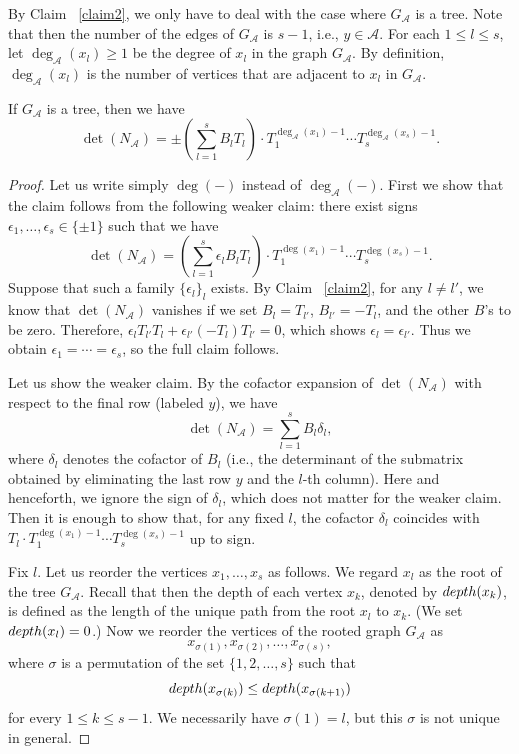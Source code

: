 \documentclass[11pt]{article}
\theoremstyle{definition}
\numberwithin{equation}{section}
\newcommand{\cA}{\mathcal{A}}
\newcommand{\depth}{{\rm depth}}
\begin{document}
By Claim ~\ref{claim2}, we only have to deal with the case where $G_{\cA}$ is a tree.
Note that then the number of the edges of $G_{\cA}$ is $s-1$, i.e., $y \in \cA$.
For each $1 \leq l \leq s$, let $\deg_{\cA}(x_l) \geq 1$ be the degree of $x_l$ in the graph $G_{\cA}$.
By definition, $\deg_{\cA}(x_l)$ is the number of vertices that are adjacent to $x_l$ in $G_{\cA}$.

\begin{claim}\label{claim3}
If $G_{\cA}$ is a tree, then we have
\[
\det(N_{\cA}) = \pm \left(\sum_{l = 1}^s B_l T_l \right) \cdot T_1^{\deg_{\cA}(x_1)-1} \cdots T_s^{\deg_{\cA}(x_s) - 1}.
\]
\end{claim}

\begin{proof}
Let us write simply $\deg(-)$ instead of $\deg_{\cA}(-)$.
First we show that the claim follows from the following weaker claim: there exist signs $\epsilon_1, \dots, \epsilon_s \in \{\pm 1\}$ such that we have
\[
\det(N_{\cA}) = \left(\sum_{l = 1}^s \epsilon_l B_l T_l \right) \cdot T_1^{\deg(x_1)-1} \cdots T_s^{\deg(x_s)-1}.
\]
Suppose that such a family $\{\epsilon_l\}_l$ exists.
By Claim ~\ref{claim2}, for any $l \neq l'$, we know that $\det(N_{\cA})$ vanishes if we set $B_l = T_{l'}$, $B_{l'} = -T_l$, and the other $B$'s to be zero.
Therefore, $\epsilon_l T_{l'} T_l + \epsilon_{l'} (-T_l) T_{l'} = 0$, which shows $\epsilon_l = \epsilon_{l'}$.
Thus we obtain $\epsilon_1 = \cdots = \epsilon_s$, so the full claim follows.

Let us show the weaker claim.
By the cofactor expansion of $\det(N_{\cA})$ with respect to the final row (labeled $y$), we have
\[
\det(N_{\cA})
= \sum_{l = 1}^s B_l \delta_l,
\]
where $\delta_l$ denotes the cofactor of $B_l$ (i.e., the determinant of the submatrix obtained by eliminating the last row $y$ and the $l$-th column).
Here and henceforth, we ignore the sign of $\delta_l$, which does not matter for the weaker claim.
Then it is enough to show that, for any fixed $l$, the cofactor $\delta_l$ coincides with $T_l \cdot T_1^{\deg(x_1)-1} \cdots T_s^{\deg(x_s)-1}$ up to sign.

Fix $l$.
Let us reorder the vertices $x_1, \dots, x_s$ as follows.
We regard $x_l$ as the root of the tree $G_{\cA}$.
Recall that then the depth of each vertex $x_k$, denoted by $\depth(x_k)$, is defined as the length of the unique path from the root $x_l$ to $x_k$.
(We set $\depth(x_l) = 0$.)
Now we reorder the vertices of the rooted graph $G_{\cA}$ as
\[
x_{\sigma(1)}, x_{\sigma(2)}, \dots, x_{\sigma(s)},
\]
where $\sigma$ is a permutation of the set $\{1, 2, \dots, s\}$ such that 
\[
\depth(x_{\sigma(k)}) \leq  \depth(x_{\sigma(k+1)})
\]
for every $1 \leq k \leq s - 1$.
We necessarily have $\sigma(1) = l$, but this $\sigma$ is not unique in general.


\end{proof}
\end{document}
